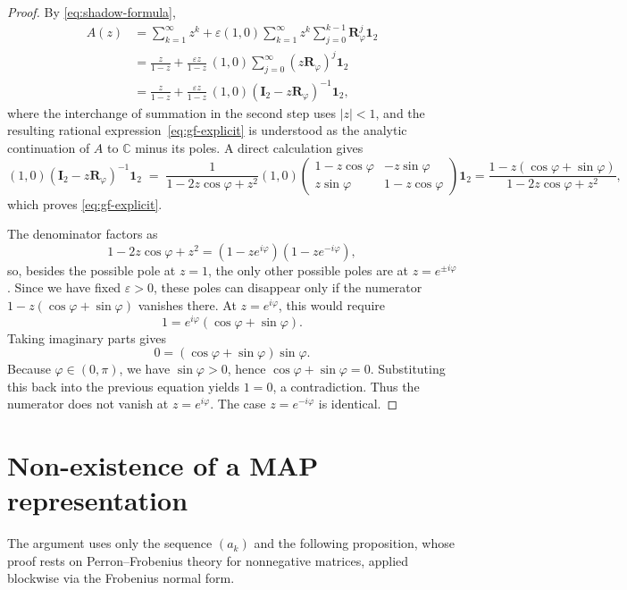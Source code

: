 \documentclass[11pt]{article}
\theoremstyle{definition}
\theoremstyle{remark}
\begin{document}
\begin{proof}
By \eqref{eq:shadow-formula},
\begin{align*}
A(z)
&=
\sum_{k=1}^\infty z^k
+
\varepsilon(1,0)\sum_{k=1}^\infty z^k\sum_{j=0}^{k-1}\bm{R}_\varphi^j\bm{1}_2\\
&=
\frac{z}{1-z}
+
\frac{\varepsilon z}{1-z}\,(1,0)\sum_{j=0}^\infty (z\bm{R}_\varphi)^j\bm{1}_2\\
&=
\frac{z}{1-z}
+
\frac{\varepsilon z}{1-z}\,(1,0)(\bm{I}_2-z\bm{R}_\varphi)^{-1}\bm{1}_2,
\end{align*}
where the interchange of summation in the second step uses $|z|<1$, and the resulting 
rational expression~\eqref{eq:gf-explicit} is understood as the analytic continuation of $A$ 
to $\mathbb{C}$ minus its poles. A direct calculation gives
\[
(1,0)(\bm{I}_2-z\bm{R}_\varphi)^{-1}\bm{1}_2
\;=\; \frac{1}{1-2z\cos\varphi+z^2}(1,0)\begin{pmatrix} 1-z\cos\varphi & -z\sin\varphi \\ z\sin\varphi & 1-z\cos\varphi \end{pmatrix}\bm{1}_2
=
\frac{1-z(\cos\varphi+\sin\varphi)}{1-2z\cos\varphi+z^2},
\]
which proves \eqref{eq:gf-explicit}.

The denominator factors as
\[
1-2z\cos\varphi+z^2=(1-ze^{i\varphi})(1-ze^{-i\varphi}),
\]
so, besides the possible pole at $z=1$, the only other possible poles are at \(z=e^{\pm i\varphi}\). Since we have fixed \(\varepsilon>0\), these poles can disappear only if the numerator $1-z(\cos\varphi+\sin\varphi)$ vanishes there. At $z=e^{i\varphi}$, this would require
\[
1=e^{i\varphi}(\cos\varphi+\sin\varphi).
\]
Taking imaginary parts gives
\[
0=(\cos\varphi+\sin\varphi)\sin\varphi.
\]
Because \(\varphi\in(0,\pi)\), we have \(\sin\varphi>0\), hence \(\cos\varphi+\sin\varphi=0\). Substituting this back into the previous equation yields \(1=0\), a contradiction. Thus the numerator does not vanish at \(z=e^{i\varphi}\). The case \(z=e^{-i\varphi}\) is identical.
\end{proof}


\section{Non-existence of a MAP representation}\label{sec:no-MAP}


The argument uses only the sequence $(a_k)$ and the following proposition, whose proof rests on Perron--Frobenius theory for nonnegative matrices, applied blockwise via the Frobenius normal form.
\end{document}
